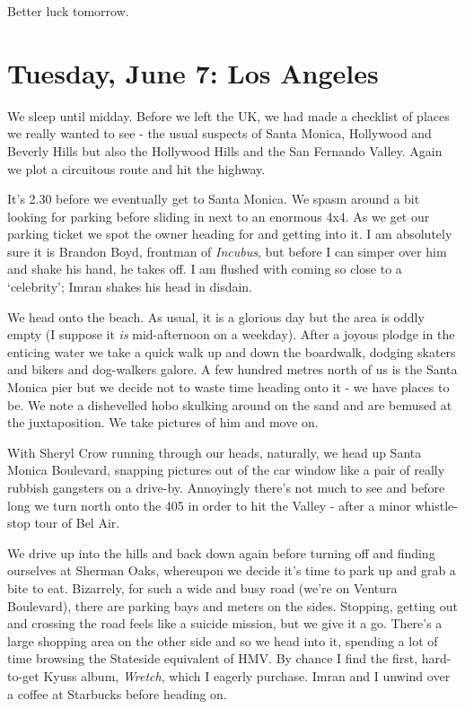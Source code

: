 \documentclass[a5paper,titlepage,11pt]{book}
\begin{document}
Better luck tomorrow.

\chapter[Los Angeles]{Tuesday, June 7:  Los Angeles}
We sleep until midday.  Before we left the UK, we had made a checklist of places we really wanted to see - the usual suspects of Santa Monica, Hollywood and Beverly Hills but also the Hollywood Hills and the San Fernando Valley.  Again we plot a circuitous route and hit the highway.

It's 2.30 before we eventually get to Santa Monica.  We spasm around a bit looking for parking before sliding in next to an enormous 4x4.  As we get our parking ticket we spot the owner heading for and getting into it.  I am absolutely sure it is Brandon Boyd, frontman of \emph{Incubus}, but before I can simper over him and shake his hand, he takes off.  I am flushed with coming so close to a `celebrity'; Imran shakes his head in disdain.

We head onto the beach.  As usual, it is a glorious day but the area is oddly empty (I suppose it \emph{is} mid-afternoon on a weekday).  After a joyous plodge in the enticing water we take a quick walk up and down the boardwalk, dodging skaters and bikers and dog-walkers galore.  A few hundred metres north of us is the Santa Monica pier but we decide not to waste time heading onto it - we have places to be.  We note a dishevelled hobo skulking around on the sand and are bemused at the juxtaposition.  We take pictures of him and move on.

With Sheryl Crow running through our heads, naturally, we head up Santa Monica Boulevard, snapping pictures out of the car window like a pair of really rubbish gangsters on a drive-by.  Annoyingly there's not much to see and before long we turn north onto the 405 in order to hit the Valley - after a minor whistle-stop tour of Bel Air.

We drive up into the hills and back down again before turning off and finding ourselves at Sherman Oaks, whereupon we decide it's time to park up and grab a bite to eat.  Bizarrely, for such a wide and busy road (we're on Ventura Boulevard), there are parking bays and meters on the sides.  Stopping, getting out and crossing the road feels like a suicide mission, but we give it a go.  There's a large shopping area on the other side and so we head into it, spending a lot of time browsing the Stateside equivalent of HMV.  By chance I find the first, hard-to-get Kyuss album, \emph{Wretch}, which I eagerly purchase.  Imran and I unwind over a coffee at Starbucks before heading on.
\end{document}
